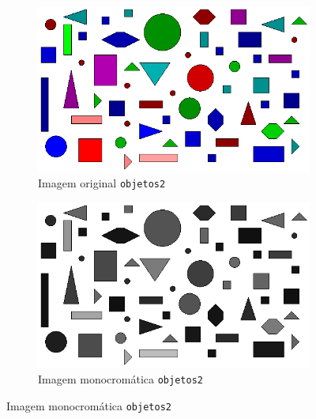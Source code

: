 \documentclass[brazilian,a4paper,twocolumn]{article}
\begin{document}
\begin{figure}[H]
            \begin{subfigure}{0.23\textwidth}
                \includegraphics[width=\textwidth,keepaspectratio]{objetos2}
                \caption{Imagem original \texttt{objetos2}}
                \label{fig:objetos2-orig}
            \end{subfigure}
            \hfill
            \begin{subfigure}{0.23\textwidth}
                \includegraphics[width=\textwidth,keepaspectratio]{objetos2-objetos}
                \caption{Imagem monocromática \texttt{objetos2}}
                \label{fig:objetos2-mono}
            \end{subfigure}


\end{figure}
\end{document}
